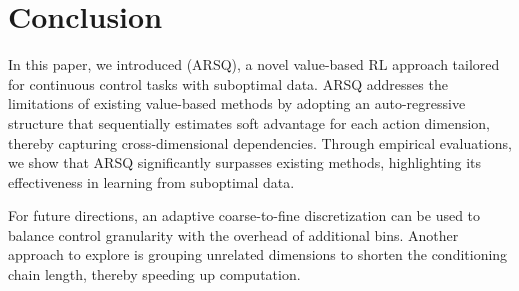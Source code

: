 \section{Conclusion}
In this paper, we introduced \arsq (ARSQ), a novel value-based RL approach tailored for continuous control tasks with suboptimal data. 
ARSQ addresses the limitations of existing value-based methods by adopting an auto-regressive structure that sequentially estimates soft advantage for each action dimension, thereby capturing cross-dimensional dependencies. 
Through empirical evaluations, we show that ARSQ significantly surpasses existing methods, highlighting its effectiveness in learning from suboptimal data.

For future directions, an adaptive coarse-to-fine discretization can be used to balance control granularity with the overhead of additional bins. 
Another approach to explore is grouping unrelated dimensions to shorten the conditioning chain length, thereby speeding up computation. 

